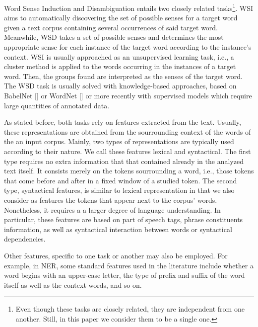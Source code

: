 \documentclass{llncs}
\begin{document}

Word Sense Induction and Disambiguation entails two closely related tasks\footnote{Even though these tasks are closely related, they are independent from one another. Still, in this paper we consider them to be a single one.}. WSI aims to automatically discovering the set of possible senses for a target word given a text corpus containing several occurrences of said target word. Meanwhile, WSD takes a set of possible senses and determines the most appropriate sense for each instance of the target word according to the instance's context. WSI is usually approached as an unsupervised learning task, i.e., a cluster method is applied to the words occurring in the instances of a target word. Then, the groups found are interpreted as the senses of the target word. The WSD task is usually solved with knowledge-based approaches, based on BabelNet [] or WordNet [] or more recently with supervised models which require large quantities of annotated data.

As stated before, both tasks rely on features extracted from the text. Usually, these representations are obtained from the sourrounding context of the words of the an input corpus. Mainly,  two types of representations are typically used according to their nature. We call these features lexical and syntactical. 	The first type requires no extra information that that contained already in the analyzed text itself. It consists merely on the tokens sourrounding a word, i.e., those tokens that come before and after in a fixed window of a studied token. The second type, syntactical features, is similar to lexical representation in that we also consider as features the tokens that appear next to the corpus' words. Nonetheless, it requires a a larger degree of language understanding. In particular, these features are based on part of speech tags, phrase constituents information, as well as syntactical interaction between words or syntactical dependencies.

Other features, specific to one task or another may also be employed. For example, in NER, some standard features used in the literature include whether a word begins with an upper-case letter, the type of prefix and suffix of the word itself as well as the context words, and so on.
\end{document}
